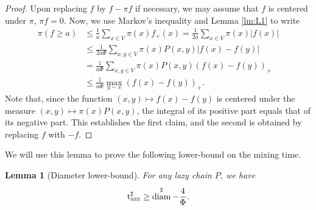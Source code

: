 \documentclass[JEP,XML,SOM,Unicode,NoEqCountersInSection,published]{cedram}
\newtheorem{lemma}{Lemma}
\theoremstyle{definition}
\newcommand{\tmix}{\mathrm{t}_{\textup{\textsc{mix}}}}
\DeclareMathOperator{\diam}{diam}
\begin{document}
\begin{proof}
Upon replacing $f$ by $f-\pi f$ if necessary, we may assume that $f$ is centered under $\pi$, \ie $\pi f=0$. Now, we use Markov's inequality and Lemma \ref{lm:L1} to write
\begin{align*}
\pi\left(f\ge a\right) & \le \frac{1}{a}\sum_{x\in V}\pi(x)f_+(x) = \frac{1}{2a}\sum_{x\in V}\pi(x)|f(x)|\\
& \le \frac{1}{2a\Phi}\sum_{x,y\in V}\pi(x)P(x,y)\left|f(x)-f(y)\right|\\
& = \frac{1}{a\Phi}\sum_{x,y\in V}\pi(x)P(x,y)\left(f(x)-f(y)\right)_+\\
& \le \frac{1}{a\Phi}\max_{y\sim x}(f(x)-f(y))_+.
\end{align*}
Note that, since the function $(x,y)\mapsto f(x)-f(y)$ is centered under the measure $(x,y)\mapsto \pi(x)P(x,y)$, the integral of its positive part equals that of its negative part. This establishes the first claim, and the second is obtained by replacing $f$ with $-f$.
\end{proof}
We will use this lemma to prove the following lower-bound on the mixing time.
\begin{lemma}[Diameter lower-bound]\label{lm:diam}For any lazy chain $P$, we have
\[
\tmix^\sharp \ge \diam^\sharp-\frac{4}{\Phi}.
\]
\end{lemma}
\end{document}
